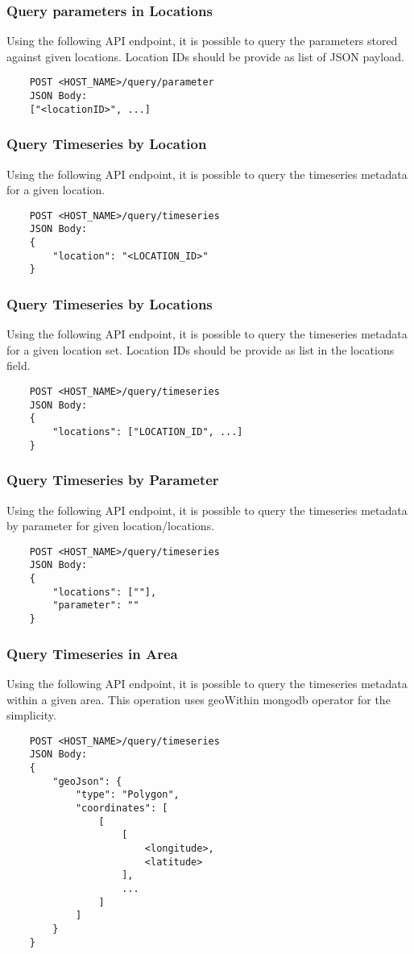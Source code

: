 \subsubsection{Query parameters in Locations}
Using the following API endpoint, it is possible to query the parameters stored against given locations. Location IDs should be provide as list of JSON payload.
\begin{lstlisting}
    POST <HOST_NAME>/query/parameter
    JSON Body:
    ["<locationID>", ...]
\end{lstlisting}

\subsubsection{Query Timeseries by Location}
Using the following API endpoint, it is possible to query the timeseries metadata for a given location.
\begin{lstlisting}
    POST <HOST_NAME>/query/timeseries
    JSON Body:
    {
        "location": "<LOCATION_ID>"
    }
\end{lstlisting}

\subsubsection{Query Timeseries by Locations}
Using the following API endpoint, it is possible to query the timeseries metadata for a given location set. Location IDs should be provide as list in the locations field.
\begin{lstlisting}
    POST <HOST_NAME>/query/timeseries
    JSON Body:
    {
        "locations": ["LOCATION_ID", ...]
    }
\end{lstlisting}

\subsubsection{Query Timeseries by Parameter}
Using the following API endpoint, it is possible to query the timeseries metadata by parameter for given location/locations.
\begin{lstlisting}
    POST <HOST_NAME>/query/timeseries
    JSON Body:
    {
        "locations": [""],
        "parameter": ""
    }
\end{lstlisting}

\subsubsection{Query Timeseries in Area}
Using the following API endpoint, it is possible to query the timeseries metadata within a given area. This operation uses geoWithin \acrshort{mongodb} operator for the simplicity.
\begin{lstlisting}
    POST <HOST_NAME>/query/timeseries
    JSON Body:
    {
        "geoJson": {
            "type": "Polygon",
            "coordinates": [
                [
                    [
                        <longitude>,
                        <latitude>
                    ],
                    ...
                ]
            ]
        }
    }
\end{lstlisting}

